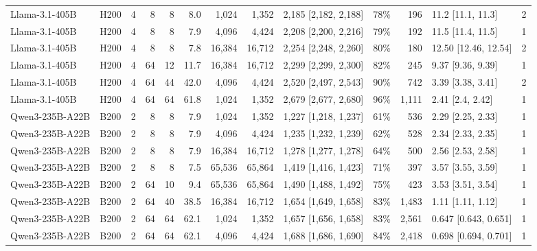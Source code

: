 \begin{landscape}
\begin{longtable}{llrrrrrrlrrlr}
Llama-3.1-405B & H200 & 4 & 8 & 8 & 8.0 & 1,024 & 1,352 & 2,185 {[}2,182, 2,188{]} & 78\% & 196 & 11.2 {[}11.1, 11.3{]} & 2 \\
Llama-3.1-405B & H200 & 4 & 8 & 8 & 7.9 & 4,096 & 4,424 & 2,208 {[}2,200, 2,216{]} & 79\% & 192 & 11.5 {[}11.4, 11.5{]} & 1 \\
Llama-3.1-405B & H200 & 4 & 8 & 8 & 7.8 & 16,384 & 16,712 & 2,254 {[}2,248, 2,260{]} & 80\% & 180 & 12.50 {[}12.46, 12.54{]} & 2 \\
Llama-3.1-405B & H200 & 4 & 64 & 12 & 11.7 & 16,384 & 16,712 & 2,299 {[}2,299, 2,300{]} & 82\% & 245 & 9.37 {[}9.36, 9.39{]} & 1 \\
Llama-3.1-405B & H200 & 4 & 64 & 44 & 42.0 & 4,096 & 4,424 & 2,520 {[}2,497, 2,543{]} & 90\% & 742 & 3.39 {[}3.38, 3.41{]} & 2 \\
Llama-3.1-405B & H200 & 4 & 64 & 64 & 61.8 & 1,024 & 1,352 & 2,679 {[}2,677, 2,680{]} & 96\% & 1,111 & 2.41 {[}2.4, 2.42{]} & 1 \\
Qwen3-235B-A22B & B200 & 2 & 8 & 8 & 7.9 & 1,024 & 1,352 & 1,227 {[}1,218, 1,237{]} & 61\% & 536 & 2.29 {[}2.25, 2.33{]} & 1 \\
Qwen3-235B-A22B & B200 & 2 & 8 & 8 & 7.9 & 4,096 & 4,424 & 1,235 {[}1,232, 1,239{]} & 62\% & 528 & 2.34 {[}2.33, 2.35{]} & 1 \\
Qwen3-235B-A22B & B200 & 2 & 8 & 8 & 7.9 & 16,384 & 16,712 & 1,278 {[}1,277, 1,278{]} & 64\% & 500 & 2.56 {[}2.53, 2.58{]} & 1 \\
Qwen3-235B-A22B & B200 & 2 & 8 & 8 & 7.5 & 65,536 & 65,864 & 1,419 {[}1,416, 1,423{]} & 71\% & 397 & 3.57 {[}3.55, 3.59{]} & 1 \\
Qwen3-235B-A22B & B200 & 2 & 64 & 10 & 9.4 & 65,536 & 65,864 & 1,490 {[}1,488, 1,492{]} & 75\% & 423 & 3.53 {[}3.51, 3.54{]} & 1 \\
Qwen3-235B-A22B & B200 & 2 & 64 & 40 & 38.5 & 16,384 & 16,712 & 1,654 {[}1,649, 1,658{]} & 83\% & 1,483 & 1.11 {[}1.11, 1.12{]} & 1 \\
Qwen3-235B-A22B & B200 & 2 & 64 & 64 & 62.1 & 1,024 & 1,352 & 1,657 {[}1,656, 1,658{]} & 83\% & 2,561 & 0.647 {[}0.643, 0.651{]} & 1 \\
Qwen3-235B-A22B & B200 & 2 & 64 & 64 & 62.1 & 4,096 & 4,424 & 1,688 {[}1,686, 1,690{]} & 84\% & 2,418 & 0.698 {[}0.694, 0.701{]} & 1 \\
\end{longtable}
\endgroup
\end{landscape}
\restoregeometry
